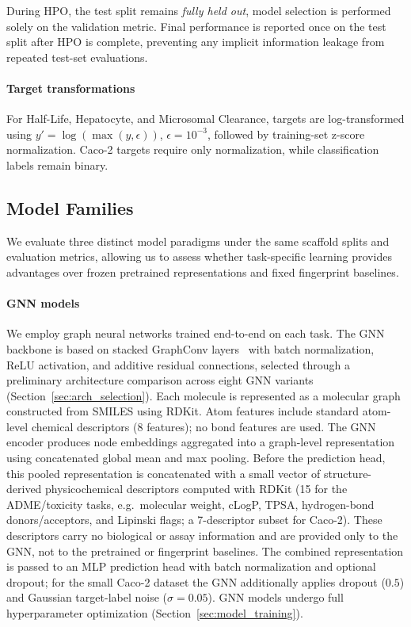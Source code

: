 \documentclass[journal]{IEEEtran}
\begin{document}
During HPO, the test split remains \emph{fully held out}, model selection is performed solely on the validation metric. Final performance is reported once on the test split after HPO is complete, preventing any implicit information leakage from repeated test-set evaluations.

\paragraph{Target transformations}
For Half-Life, Hepatocyte, and Microsomal Clearance, targets are log-transformed using $y'=\log(\max(y,\epsilon))$, $\epsilon=10^{-3}$, followed by training-set z-score normalization. Caco-2 targets require only normalization, while classification labels remain binary.

\subsection{Model Families}
\label{sec:model_families}

We evaluate three distinct model paradigms under the same scaffold splits and evaluation metrics, allowing us to assess whether task-specific learning provides advantages over frozen pretrained representations and fixed fingerprint baselines.

\paragraph{GNN models}
We employ graph neural networks trained end-to-end on each task. The GNN backbone is based on stacked GraphConv layers~\cite{morris2019wlgnn} with batch normalization, ReLU activation, and additive residual connections, selected through a preliminary architecture comparison across eight GNN variants (Section~\ref{sec:arch_selection}). Each molecule is represented as a molecular graph constructed from SMILES using RDKit. Atom features include standard atom-level chemical descriptors (8 features); no bond features are used. The GNN encoder produces node embeddings aggregated into a graph-level representation using concatenated global mean and max pooling. Before the prediction head, this pooled representation is concatenated with a small vector of structure-derived physicochemical descriptors computed with RDKit (15 for the ADME/toxicity tasks, e.g.\ molecular weight, cLogP, TPSA, hydrogen-bond donors/acceptors, and Lipinski flags; a 7-descriptor subset for Caco-2). These descriptors carry no biological or assay information and are provided only to the GNN, not to the pretrained or fingerprint baselines. The combined representation is passed to an MLP prediction head with batch normalization and optional dropout; for the small Caco-2 dataset the GNN additionally applies dropout ($0.5$) and Gaussian target-label noise ($\sigma=0.05$). GNN models undergo full hyperparameter optimization (Section~\ref{sec:model_training}).
\end{document}
